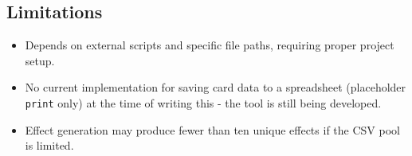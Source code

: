 \subsection{Limitations}
\begin{itemize}
	\item Depends on external scripts and specific file paths, requiring proper project setup.
	\item No current implementation for saving card data to a spreadsheet (placeholder \texttt{print} only) at the time of writing this - the tool is still being developed.
	\item Effect generation may produce fewer than ten unique effects if the CSV pool is limited.
\end{itemize}
